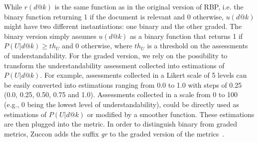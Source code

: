While $r(d@k)$ is the same function as in the original version of RBP, i.e. the binary function returning 1 if the document is relevant and 0 otherwise, $u(d@k)$ might have two different instantiations: one binary and the other graded. The binary version simply assumes $u(d@k)$ as a binary function that returns 1 if $P(U|d@k) \geq th_U$ and 0 otherwise, where $th_U$ is a threshold on the assessments of understandability. 
For the graded version, we rely on the possibility to transform the understandability assessment collected into estimations of $P(U|d@k)$.
For example, assessments collected in a Likert scale of 5 levels can be easily converted into estimations ranging from 0.0 to 1.0 with steps of 0.25 (0.0, 0.25, 0.50, 0.75 and 1.0).
Assessments collected in a scale from 0 to 100 (e.g., 0 being the lowest level of understandability), could be directly used as estimations of $P(U|d@k)$ or modified by a smoother function.
These estimations are then plugged into the metric. In order to distinguish binary from graded metrics, Zuccon adds the suffix \textit{gr} to the graded version of the metrics~\cite{zuccon16}.




